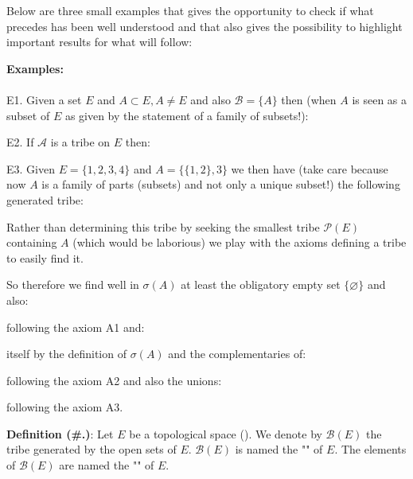 	Below are three small examples that gives the opportunity to check if what precedes has been well understood and that also gives the possibility to highlight important results for what will follow:
	\begin{tcolorbox}[colframe=black,colback=white,sharp corners, breakable]
	\textbf{{\Large {}}Examples:}\\\\
	E1. Given a set $E$ and $A\subset E,A \neq E$ and also $\mathcal{B}=\{A\}$ then (when $A$ is seen as a subset of $E$ as given by the statement of a family of subsets!):
	
	
	E2. If $\mathcal{A}$ is a tribe on $E$ then:
	

	E3. Given $E=\{1,2,3,4\}$ and $A=\{\{1,2\},{3}\}$ we then have (take care because now $A$ is a family of parts (subsets) and not only a unique subset!) the following generated tribe:
	
	Rather than determining this tribe by seeking the smallest tribe $\mathcal{P}(E)$ containing $A$ (which would be laborious) we play with the axioms defining a tribe to easily find it.
	
	So therefore we find well in $\sigma(A)$ at least the obligatory empty set $\{\varnothing\}$ and also:
	
	following the axiom A1 and:
	
	itself by the definition of $\sigma(A)$ and the complementaries of:
	
	following the axiom A2 and also the unions:
	
	following the axiom A3.
	\end{tcolorbox}
	\textbf{Definition (\#\thesection.\mydef)}: Let $E$ be a topological space (). We denote by $\mathcal{B}(E)$ the tribe generated by the open sets of $E$. $\mathcal{B}(E)$ is named the "" of $E$. The elements of $\mathcal{B}(E)$ are named the "" of $E$. 
	
